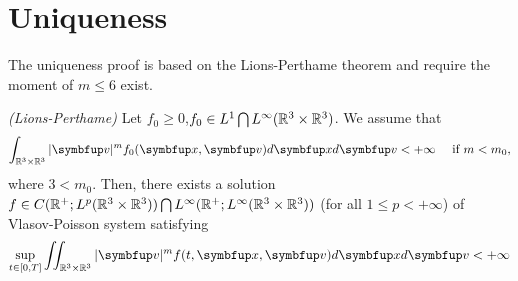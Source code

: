 \section{Uniqueness}


The uniqueness proof is based on the Lions-Perthame theorem and require the moment of $m\leqslant 6$ exist.
\begin{theorem}\textit{(Lions-Perthame)}
    Let $f_0\geq 0$,$f_0\in L^1\bigcap L^\infty ({\mathbb{R}}^{3}\times {\mathbb{R}}^{3})$. We assume that  
    \begin{equation}
        \int_{\bbRRR \times \bbRRR}|\vv|^{m} f_{0}(\vx, \vv) d \vx d \vv<+\infty \quad \text { if } m<m_{0},
    \end{equation}
    where $3<m_0$. Then, there exists a solution $f\in C({\mathbb{R}}^+; L^p({\mathbb{R}}^{3}\times{\mathbb{R}}^{3}))\bigcap L^\infty ({\mathbb{R}}^+;L^\infty({\mathbb{R}}^{3}\times {\mathbb{R}}^{3}))$ (for all $1\leq p < +\infty$) of Vlasov-Poisson system satisfying 
    \begin{equation}
    \sup _{t \in[0, T]} \iint_{ \mathbb{R}^{3} \times \mathbb{R}^{3}}|\vv|^{m} \ftxv d \vx d \vv<+\infty
    \end{equation}
\end{theorem}


    








